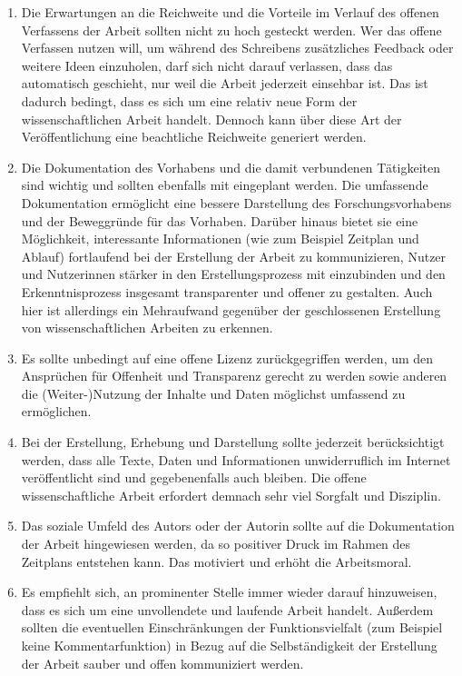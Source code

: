 \begin{enumerate}
\item Die Erwartungen an die Reichweite und die Vorteile im Verlauf des offenen Verfassens der Arbeit sollten nicht zu hoch gesteckt werden. Wer das offene Verfassen nutzen will, um während des Schreibens zusätzliches Feedback oder weitere Ideen einzuholen, darf sich nicht darauf verlassen, dass das automatisch geschieht, nur weil die Arbeit jederzeit einsehbar ist. Das ist dadurch bedingt, dass es sich um eine relativ neue Form der wissenschaftlichen Arbeit handelt. Dennoch kann über diese Art der Veröffentlichung eine beachtliche Reichweite generiert werden.
\item Die Dokumentation des Vorhabens und die damit verbundenen Tätigkeiten sind wichtig und sollten ebenfalls mit eingeplant werden. Die umfassende Dokumentation ermöglicht eine bessere Darstellung des Forschungsvorhabens und der Beweggründe für das Vorhaben. Darüber hinaus bietet sie eine Möglichkeit, interessante Informationen (wie zum Beispiel Zeitplan und Ablauf) fortlaufend bei der Erstellung der Arbeit zu kommunizieren, Nutzer und Nutzerinnen stärker in den Erstellungsprozess mit einzubinden und den Erkenntnisprozess insgesamt transparenter und offener zu gestalten. Auch hier ist allerdings ein Mehraufwand gegenüber der geschlossenen Erstellung von wissenschaftlichen Arbeiten zu erkennen.
\item Es sollte unbedingt auf eine offene Lizenz zurückgegriffen werden, um den Ansprüchen für Offenheit und Transparenz gerecht zu werden sowie anderen die (Weiter-)Nutzung der Inhalte und Daten möglichst umfassend zu ermöglichen.
\item Bei der Erstellung, Erhebung und Darstellung sollte jederzeit berücksichtigt werden, dass alle Texte, Daten und Informationen unwiderruflich im Internet veröffentlicht sind und gegebenenfalls auch bleiben. Die offene wissenschaftliche Arbeit erfordert demnach sehr viel Sorgfalt und Disziplin.
\item Das soziale Umfeld des Autors oder der Autorin sollte auf die Dokumentation der Arbeit hingewiesen werden, da so positiver Druck im Rahmen des Zeitplans entstehen kann. Das motiviert und erhöht die Arbeitsmoral.
\item Es empfiehlt sich, an prominenter Stelle immer wieder darauf hinzuweisen, dass es sich um eine unvollendete und laufende Arbeit handelt. Außerdem sollten die eventuellen Einschränkungen der Funktionsvielfalt (zum Beispiel keine Kommentarfunktion) in Bezug auf die Selbständigkeit der Erstellung der Arbeit sauber und offen kommuniziert werden.
\end{enumerate}

